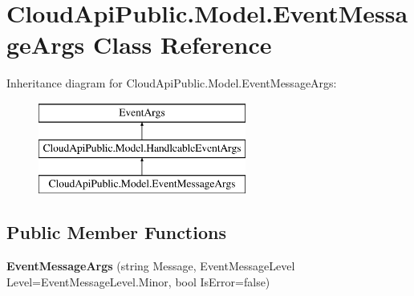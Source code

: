 \hypertarget{class_cloud_api_public_1_1_model_1_1_event_message_args}{\section{Cloud\-Api\-Public.\-Model.\-Event\-Message\-Args Class Reference}
\label{class_cloud_api_public_1_1_model_1_1_event_message_args}
}
Inheritance diagram for Cloud\-Api\-Public.\-Model.\-Event\-Message\-Args\-:\begin{figure}[H]
\begin{center}
\leavevmode
\includegraphics[height=3.000000cm]{class_cloud_api_public_1_1_model_1_1_event_message_args}
\end{center}
\end{figure}
\subsection*{Public Member Functions}
\begin{DoxyCompactItemize}
\item 
\hypertarget{class_cloud_api_public_1_1_model_1_1_event_message_args_a822c5bb3dea7224d72a7e816dbf25aa7}{{\bfseries Event\-Message\-Args} (string Message, Event\-Message\-Level Level=Event\-Message\-Level.\-Minor, bool Is\-Error=false)}\label{class_cloud_api_public_1_1_model_1_1_event_message_args_a822c5bb3dea7224d72a7e816dbf25aa7}

\end{DoxyCompactItemize}
